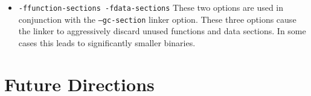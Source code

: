 \documentclass{acmconf}
\begin{document}
\begin{itemize}
\item {\tt -ffunction-sections -fdata-sections}
These two options are used in conjunction with the {\tt --gc-section} linker
option. These three options cause the linker to aggressively discard unused
functions and data sections. In some cases this leads to significantly
smaller binaries.

\end{itemize}

\section{Future Directions}
\end{document}
